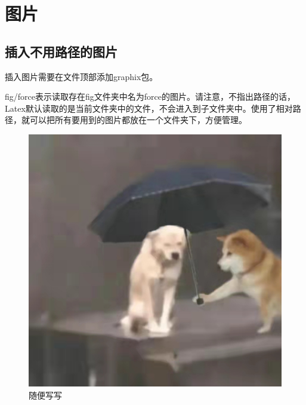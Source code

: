 \documentclass[UTF8,a4paper,10pt,twocolumn]{article}
\begin{document}
	\section{图片}
	\subsection{插入不用路径的图片}
	插入图片需要在文件顶部添加graphix包。
	
	{fig/force}表示读取存在fig文件夹中名为force的图片。请注意，不指出路径的话，Latex默认读取的是当前文件夹中的文件，不会进入到子文件夹中。使用了相对路径，就可以把所有要用到的图片都放在一个文件夹下，方便管理。
	
	\begin{figure} [!h] %
		\centering %
		\includegraphics[width=0.7\linewidth]{fig/1} %
		\caption{随便写写} %
	\end{figure}
\end{document}
